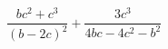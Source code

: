 \begin{ex}[type=expression]
	\begin{condition}
		\( \dfrac{bc^2+c^3}{(b-2c)^2}+\dfrac{3c^3}{4bc-4c^2-b^2} \)
	\end{condition}
\end{ex}